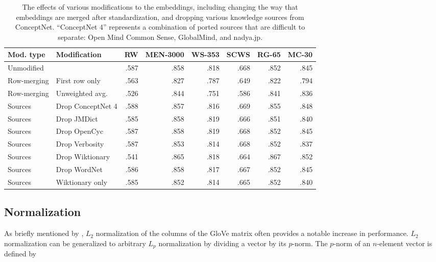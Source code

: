 \documentclass[letterpaper]{article}
\begin{document}
\begin{table*}[t]
\centering
\begin{tabular}{llrrrrrr}
\toprule
Mod. type       & Modification        &   RW &  MEN-3000 &  WS-353 &  SCWS &  RG-65 &  MC-30 \\
\midrule
Unmodified      &                     & .587 &      .858 &    .818 &  .668 &   .852 &   .845 \\
\midrule
Row-merging     & First row only      & .563 &      .827 &    .787 &  .649 &   .822 &   .794 \\
Row-merging     & Unweighted avg.     & .526 &      .844 &    .751 &  .586 &   .841 &   .836 \\
\midrule
Sources         & Drop ConceptNet 4   & .588 &      .857 &    .816 &  .669 &   .855 &   .848 \\
Sources         & Drop JMDict         & .585 &      .858 &    .819 &  .666 &   .851 &   .840 \\
Sources         & Drop OpenCyc        & .587 &      .858 &    .819 &  .668 &   .852 &   .845 \\
Sources         & Drop Verbosity      & .587 &      .853 &    .814 &  .668 &   .852 &   .837 \\
Sources         & Drop Wiktionary     & .541 &      .865 &    .818 &  .664 &   .867 &   .852 \\
Sources         & Drop WordNet        & .586 &      .858 &    .817 &  .667 &   .852 &   .845 \\
Sources         & Wiktionary only     & .585 &      .852 &    .814 &  .665 &   .852 &   .840 \\
\bottomrule
\end{tabular}
\caption{
    The effects of various modifications to the embeddings, including
    changing the way that embeddings are merged after standardization, and
    dropping various knowledge sources from ConceptNet. ``ConceptNet 4''
    represents a combination of ported sources that are difficult to
    separate: Open Mind Common Sense, GlobalMind, and nadya.jp.
}
\label{eval-variations}
\end{table*}

\subsection{Normalization}

As briefly mentioned by , $L_2$ normalization of
the columns of the GloVe matrix often provides a notable increase in
performance. $L_2$ normalization can be generalized to arbitrary
$L_p$ normalization by dividing a vector by its $p$-norm. The $p$-norm of an
$n$-element vector is defined by
\end{document}
